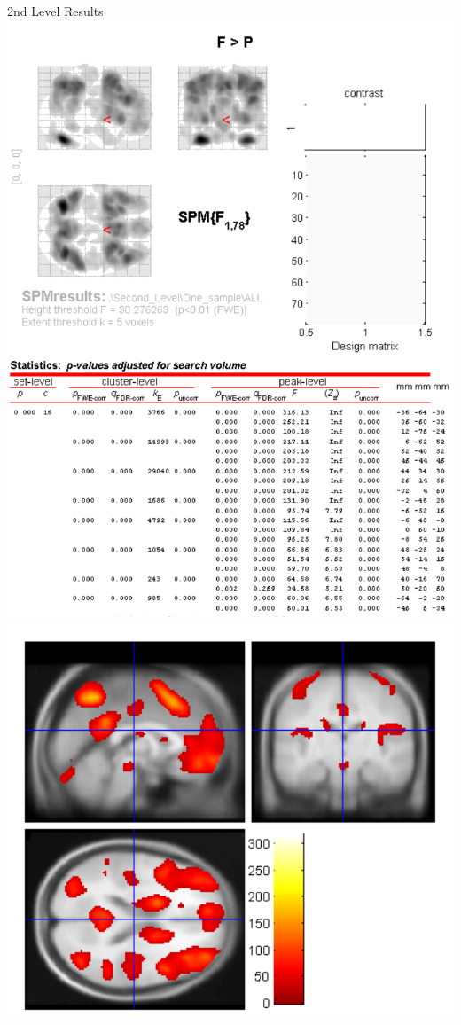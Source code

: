 \documentclass{bredelebeamer}
\begin{document}
\begin{frame}{2nd Level Results}
\centering
\includegraphics[scale=0.3]{images/SPM2.PNG}
\includegraphics[scale=0.3]{images/SPM1.PNG} 
\end{frame}
\end{document}
